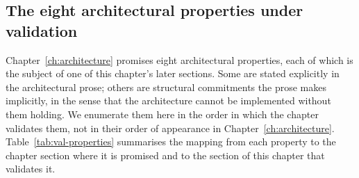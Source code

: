 \subsection{The eight architectural properties under validation}
\label{subsec:val-properties}

Chapter~\ref{ch:architecture} promises eight architectural properties,
each of which is the subject of one of this chapter's later sections.
Some are stated explicitly in the architectural prose; others are
structural commitments the prose makes implicitly, in the sense that
the architecture cannot be implemented without them holding. We
enumerate them here in the order in which the chapter validates them,
not in their order of appearance in Chapter~\ref{ch:architecture}.
Table~\ref{tab:val-properties} summarises the mapping from each
property to the chapter section where it is promised and to the
section of this chapter that validates it.

